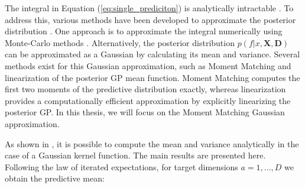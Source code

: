 The integral in Equation (\ref{eq:single_prediciton}) is analytically intractable \cite{hewing2017cautious}. To address this, various methods have been developed to approximate the posterior distribution \cite{girard2003gaussian}. One approach is to approximate the integral numerically using Monte-Carlo methods \cite{girard2002gaussian}. Alternatively, the posterior distribution \( p(f|x, \mathbf{X}, \mathbf{D}) \) can be approximated as a Gaussian by calculating its mean and variance. Several methods exist for this Gaussian approximation, such as Moment Matching and linearization of the posterior GP mean function\cite{marc2015robotics}. Moment Matching computes the first two moments of the predictive distribution exactly, whereas linearization provides a computationally efficient approximation by explicitly linearizing the posterior GP. In this thesis, we will focus on the Moment Matching Gaussian approximation.



As shown in \cite{quignonero2003propagation}, it is possible to compute the mean and variance analytically in the case of a Gaussian kernel function. The main results are presented here. Following the law of iterated expectations, for target dimensions \( a = 1,..., D \) we obtain the predictive mean:

